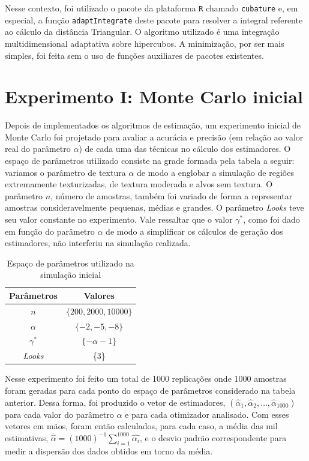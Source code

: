 Nesse contexto, foi utilizado o pacote da plataforma \texttt{R} chamado \texttt{cubature} e, em especial, a função \texttt{adaptIntegrate} deste pacote para resolver a integral referente ao cálculo da distância Triangular. O algoritmo utilizado é uma integração multidimensional adaptativa sobre hipercubos. 
A minimização, por ser mais simples, foi feita sem o uso de funções auxiliares de pacotes existentes.

\section{Experimento I: Monte Carlo inicial}

Depois de implementados os algoritmos de estimação, um experimento inicial de Monte Carlo foi projetado para avaliar a acurácia e precisão (em relação ao valor real do parâmetro $\alpha$) de cada uma das técnicas no cálculo dos estimadores. 
O espaço de parâmetros utilizado consiste na grade formada pela tabela a seguir: 
variamos o parâmetro de textura $\alpha$ de modo a englobar a simulação de regiões extremamente texturizadas, de textura moderada e alvos sem textura. 
O parâmetro $n$, número de amostras, também foi variado de forma a representar amostras consideravelmente pequenas, médias e grandes. 
O parâmetro \textit{Looks} teve seu valor constante no experimento. 
Vale ressaltar que o valor $\gamma^{*}$, como foi dado em função do parâmetro $\alpha$ de modo a simplificar os cálculos de geração dos estimadores, não interferiu na simulação realizada.

\begin{table}[H]
\centering
\caption{Espaço de parâmetros utilizado na simulação inicial}
\label{tab:tabela_parameters}
\begin{tabular}{c|c}
\toprule 
\multicolumn{1}{c|}{Parâmetros} & \multicolumn{1}{c}{Valores}  \\ 
\midrule
\rowcolor[gray]{.9} 
$n$ & $\{200, 2000, 10000\}$ \\ \hline
$\alpha$ & $\{-2, -5, -8\}$ \\ \hline
\rowcolor[gray]{.9} $\gamma^{*}$ & $\{-\alpha - 1\}$ \\ \hline
\textit{Looks} & \{3\} \\ 
\bottomrule
\end{tabular}
\end{table}

Nesse experimento foi feito um total de 1000 replicações onde 1000 amostras foram geradas para cada ponto do espaço de parâmetros considerado na tabela anterior. Dessa forma, foi produzido o vetor de estimadores, $(\widehat{\alpha}_{1}, \widehat{\alpha}_{2}, \dots, \widehat{\alpha}_{1000})$ para cada valor do parâmetro $\alpha$ e para cada otimizador analisado. Com esses vetores em mãos, foram então calculados, para cada caso, a média das mil estimativas, $ \overline{\widehat{\alpha}} = (1000)^{-1} \sum_{i=1}^{1000} \widehat{\alpha_{i}} $, e o desvio padrão correspondente para medir a dispersão dos dados obtidos em torno da média. 

